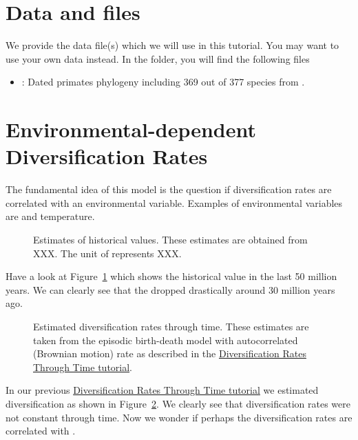 \section{Data and files}

We provide the data file(s) which we will use in this tutorial.
You may want to use your own data instead.
In the  folder, you will find the following files
\begin{itemize}
\item {}: Dated primates phylogeny including 369 out of 377 species from \cite{Springer2012}.
\end{itemize}




\bigskip
\section{Environmental-dependent Diversification Rates}

The fundamental idea of this model is the question if diversification rates are correlated with an environmental variable.
Examples of environmental variables are \COO and temperature.
\begin{figure}[h!]
\centering
{}
\caption{\small Estimates of historical \COO values. These estimates are obtained from {\color{red}XXX}. The unit of \COO represents {\color{red}XXX}.}
\label{fig:CO2}
\end{figure}
Have a look at Figure~\ref{fig:CO2} which shows the historical value \COO in the last 50 million years.
We can clearly see that the \COO dropped drastically around 30 million years ago.

\begin{figure}[h!]
\centering
{}
\caption{\small Estimated diversification rates through time. These estimates are taken from the episodic birth-death model with autocorrelated (Brownian motion) rate as described in the \href{https://github.com/revbayes/revbayes_tutorial/raw/master/tutorial_TeX/RB_DiversificationRate_Episodic_Tutorial/RB_DiversificationRate_Episodic_Tutorial.pdf}{Diversification Rates Through Time tutorial}.}
\label{fig:EBD_estimates}
\end{figure}
In our previous \href{https://github.com/revbayes/revbayes_tutorial/raw/master/tutorial_TeX/RB_DiversificationRate_Episodic_Tutorial/RB_DiversificationRate_Episodic_Tutorial.pdf}{Diversification Rates Through Time tutorial} we estimated diversification as shown in Figure~\ref{fig:EBD_estimates}.
We clearly see that diversification rates were not constant through time.
Now we wonder if perhaps the diversification rates are correlated with \COO.

